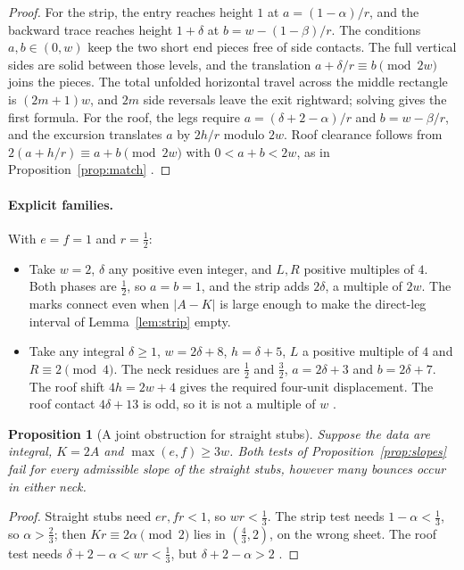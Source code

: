 \documentclass[11pt]{article}
\newtheorem{proposition}{Proposition}
\theoremstyle{definition}
\theoremstyle{remark}
\begin{document}
\begin{proof}
For the strip, the entry reaches height $1$ at $a=(1-\alpha)/r$, and the
backward trace reaches height $1+\delta$ at $b=w-(1-\beta)/r$. The conditions
$a,b\in(0,w)$ keep the two short end pieces free of side contacts. The full
vertical sides are solid between those levels, and the translation
$a+\delta/r\equiv b\pmod{2w}$ joins the pieces. The total unfolded horizontal
travel across the middle rectangle is $(2m+1)w$, and $2m$ side reversals leave
the exit rightward; solving gives the first formula. For the roof, the legs
require $a=(\delta+2-\alpha)/r$ and $b=w-\beta/r$, and the excursion translates
$a$ by $2h/r$ modulo $2w$. Roof clearance follows from
$2(a+h/r)\equiv a+b\pmod{2w}$ with $0<a+b<2w$, as in
Proposition~\ref{prop:match} \cite{R4,d202}.
\end{proof}

\paragraph{Explicit families.} With $e=f=1$ and $r=\tfrac12$:
\begin{itemize}
\item Take $w=2$, $\delta$ any positive even integer, and $L,R$ positive
multiples of $4$. Both phases are $\tfrac12$, so $a=b=1$, and the strip adds
$2\delta$, a multiple of $2w$. The marks connect even when $|A-K|$ is large
enough to make the direct-leg interval of Lemma~\ref{lem:strip} empty.
\item Take any integral $\delta\ge 1$, $w=2\delta+8$, $h=\delta+5$, $L$ a
positive multiple of $4$ and $R\equiv 2\pmod 4$. The neck residues are
$\tfrac12$ and $\tfrac32$, $a=2\delta+3$ and $b=2\delta+7$. The roof shift
$4h=2w+4$ gives the required four-unit displacement. The roof contact
$4\delta+13$ is odd, so it is not a multiple of $w$ \cite{d202}.
\end{itemize}

\begin{proposition}[A joint obstruction for straight stubs]\label{prop:K2A}
Suppose the data are integral, $K=2A$ and $\max(e,f)\ge 3w$. Both tests of
Proposition~\ref{prop:slopes} fail for every admissible slope of the straight
stubs, however many bounces occur in either neck.
\end{proposition}

\begin{proof}
Straight stubs need $er,fr<1$, so $wr<\tfrac13$. The strip test needs
$1-\alpha<\tfrac13$, so $\alpha>\tfrac23$; then $Kr\equiv 2\alpha\pmod 2$ lies in
$(\tfrac43,2)$, on the wrong sheet. The roof test needs
$\delta+2-\alpha<wr<\tfrac13$, but $\delta+2-\alpha>2$ \cite{R4,d202}.
\end{proof}
\end{document}
